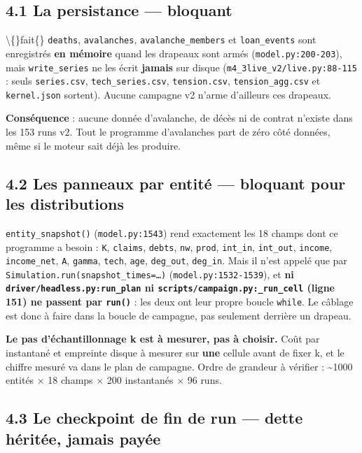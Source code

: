 \documentclass[11pt,a4paper]{article}
\newcommand{\code}[1]{\texttt{#1}}
\begin{document}
\subsection*{4.1 La persistance --- bloquant}

\textbackslash\{\}fait\{\} \code{deaths}, \code{avalanches}, \code{avalanche\_members} et \code{loan\_events} sont enregistrés \textbf{en mémoire} quand les drapeaux sont armés (\code{model.py:200-203}), mais \code{write\_series} ne les écrit \textbf{jamais} sur disque (\code{m4\_3live\_v2/live.py:88-115} : seuls \code{series.csv}, \code{tech\_series.csv}, \code{tension.csv}, \code{tension\_agg.csv} et \code{kernel.json} sortent). Aucune campagne v2 n'arme d'ailleurs ces drapeaux.

\textbf{Conséquence} : aucune donnée d'avalanche, de décès ni de contrat n'existe dans les 153 runs v2. Tout le programme d'avalanches part de zéro côté données, même si le moteur sait déjà les produire.

\subsection*{4.2 Les panneaux par entité --- bloquant pour les distributions}

\code{entity\_snapshot()} (\code{model.py:1543}) rend exactement les 18 champs dont ce programme a besoin : \code{K}, \code{claims}, \code{debts}, \code{nw}, \code{prod}, \code{int\_in}, \code{int\_out}, \code{income}, \code{income\_net}, \code{A}, \code{gamma}, \code{tech}, \code{age}, \code{deg\_out}, \code{deg\_in}. Mais il n'est appelé que par \code{Simulation.run(snapshot\_times=\dots{})} (\code{model.py:1532-1539}), et \textbf{ni \code{driver/headless.py:run\_plan} ni \code{scripts/campaign.py:\_run\_cell} (ligne 151) ne passent par \code{run()}} : les deux ont leur propre boucle \code{while}. Le câblage est donc à faire dans la boucle de campagne, pas seulement derrière un drapeau.

\textbf{Le pas d'échantillonnage k est à mesurer, pas à choisir.} Coût par instantané et empreinte disque à mesurer sur \textbf{une} cellule avant de fixer k, et le chiffre mesuré va dans le plan de campagne. Ordre de grandeur à vérifier : \textasciitilde{}1000 entités \ensuremath{\times} 18 champs \ensuremath{\times} 200 instantanés \ensuremath{\times} 96 runs.

\subsection*{4.3 Le checkpoint de fin de run --- dette héritée, jamais payée}
\end{document}
